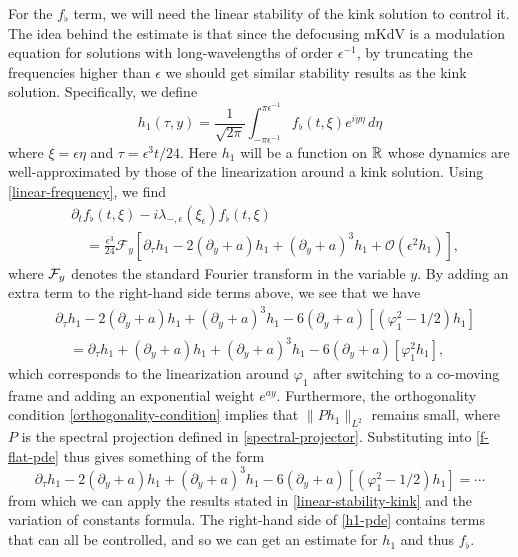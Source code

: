 For the \(f_\flat\) term, we will need the linear stability of the kink solution to control it. The idea behind the estimate is that since the defocusing mKdV is a modulation equation for solutions with long-wavelengths of order \(\epsilon^{-1}\), by truncating the frequencies higher than \(\epsilon\) we should get similar stability results as the kink solution. Specifically, we define
\begin{equation}
	h_1(\tau, y) = \frac 1 {\sqrt {2\pi}} \int_{-\pi\epsilon^{-1}}^{\pi \epsilon^{-1}} f_\flat (t, \xi) e^{iy\eta}\, d \eta 
\end{equation}
where \(\xi = \epsilon \eta\) and \(\tau = \epsilon^3 t/24\). Here \(h_1\) will be a function on \(\mathbb{R}\) whose dynamics are well-approximated by those of the linearization around a kink solution. Using \cref{linear-frequency}, we find 
\begin{equation}
	\begin{aligned}
		&\partial_t f_\flat (t,\xi) - i \lambda_{-,\epsilon}(\xi_\epsilon) f_\flat(t,\xi) \\
		&\quad = \frac{\epsilon^3}{24} \mathcal F_y[\partial_\tau h_1 - 2 (\partial_y + a) h_1 + (\partial_y + a)^3 h_1 + \mathcal O(\epsilon^2 h_1)],
	\end{aligned}
\end{equation}
where \(\mathcal{F}_y\) denotes the standard Fourier transform in the variable \(y\). By adding an extra term to the right-hand side terms above, we see that we have
\begin{equation}
	\begin{aligned}
		&\partial_\tau h_1 - 2(\partial_y + a) h_1 + (\partial_y + a)^3 h_1 - 6 (\partial_y + a) [(\varphi_1^2 - 1/2) h_1 ]\\
		&\quad= \partial_\tau h_1 + (\partial_y + a ) h_1 + (\partial_y +a)^3 h_1 - 6 (\partial_y + a) [\varphi_1^2 h_1],
	\end{aligned}
\end{equation}
which corresponds to the linearization around \(\varphi_1\) after switching to a co-moving frame and adding an exponential weight \(e^{ay}\). Furthermore, the orthogonality condition \cref{orthogonality-condition} implies that \( \| P h_1 \|_{L^2}\) remains small, where \(P\) is the spectral projection defined in \cref{spectral-projector}. Substituting into \cref{f-flat-pde} thus gives something of the form
\begin{equation}\label{h1-pde}
	\partial_\tau h_1 - 2(\partial_y + a) h_1 + (\partial_y + a)^3 h_1 - 6 (\partial_y + a) [(\varphi_1^2 - 1/2) h_1 ] = \cdots
\end{equation}
from which we can apply the results stated in \cref{linear-stability-kink} and the variation of constants formula. The right-hand side of \cref{h1-pde} contains terms that can all be controlled, and so we can get an estimate for \(h_1\) and thus \(f_\flat\).
